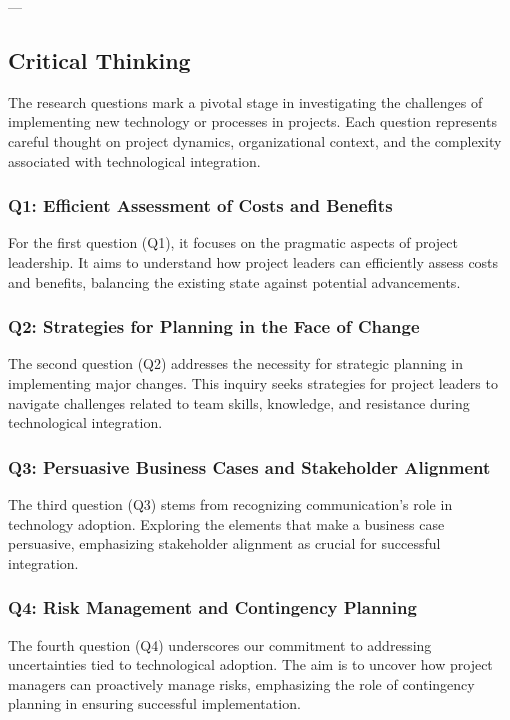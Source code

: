 \documentclass{article}
\begin{document}
---
\subsection{Critical Thinking}

The research questions mark a pivotal stage in investigating the challenges of implementing new technology or processes in projects. Each question represents careful thought on project dynamics, organizational context, and the complexity associated with technological integration.

\subsubsection*{Q1: Efficient Assessment of Costs and Benefits}

For the first question (Q1), it focuses on the pragmatic aspects of project leadership. It aims to understand how project leaders can efficiently assess costs and benefits, balancing the existing state against potential advancements.

\subsubsection*{Q2: Strategies for Planning in the Face of Change}

The second question (Q2) addresses the necessity for strategic planning in implementing major changes. This inquiry seeks strategies for project leaders to navigate challenges related to team skills, knowledge, and resistance during technological integration.

\subsubsection*{Q3: Persuasive Business Cases and Stakeholder Alignment}

The third question (Q3) stems from recognizing communication’s role in technology adoption. Exploring the elements that make a business case persuasive, emphasizing stakeholder alignment as crucial for successful integration.

\subsubsection*{Q4: Risk Management and Contingency Planning}

The fourth question (Q4) underscores our commitment to addressing uncertainties tied to technological adoption. The aim is to uncover how project managers can proactively manage risks, emphasizing the role of contingency planning in ensuring successful implementation.
\newline
\end{document}
